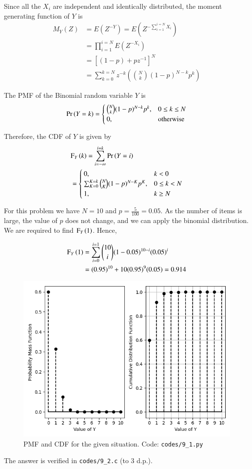 \documentclass[journal,12pt,twocolumn]{IEEEtran}
\begin{document}
\noindent Since all the $X_i$ are independent and identically distributed, the moment generating function of $Y$ is
\begin{align}
M_Y(Z) &= E(Z^{-Y}) = E(Z^{-\sum_{i = 1}^{i = N}X_i}) \\
&= \prod_{i = 1}^{i = N}E(Z^{-X_i}) \\
&= [(1 - p) + pz^{-1}]^N \\
&= \sum_{k = 0}^{k = N}z^{-k}(\binom{N}{k}(1 - p)^{N - k}p^k)
\label{mgf-Y}
\end{align}

\noindent The PMF of the Binomial random variable $Y$ is
\begin{align}
\Pr\left(Y = k\right) = 
\begin{cases}
\binom{N}{k}(1 - p)^{N - k}p^k, & 0 \leq k \leq N \\
0, & \textrm{otherwise}
\end{cases}
\label{pmf-Y}
\end{align}

\noindent Therefore, the CDF of $Y$ is given by
\begin{align}
&\text{F}_{Y}\left(k\right) = \sum_{i = -\infty}^{i = k}\Pr\left(Y = i\right) \nonumber\\
&=\begin{cases}
0, & k < 0 \\
\sum_{K = 0}^{K = k}\binom{N}{K}(1 - p)^{N - K}p^K, & 0 \leq k < N \\
1, & k \geq N
\end{cases}
\label{cdf-Y}
\end{align}

\noindent For this problem we have $N = 10$ and $p = \frac{5}{100} = 0.05$. As the number of items is large, the value of $p$ does not change, and we can apply the binomial distribution. We are required to find $\text{F}_{Y}\left(1\right)$. Hence, 

\begin{align}
\text{F}_{Y}\left(1\right) &= \sum_{i = 0}^{i = 1}\binom{10}{i}(1 - 0.05)^{10 - i}(0.05)^i \\
&= (0.95)^{10} + 10(0.95)^9(0.05) = 0.914
\end{align} 

\begin{figure}[!htb]
\includegraphics[width=\columnwidth]{figs/9_1.png}
\caption{PMF and CDF for the given situation. Code: \texttt{codes/9{\_}1.py}}
\label{fig:pmf-cdf}
\end{figure}
\noindent The answer is verified in \texttt{codes/9{\_}2.c} (to 3 d.p.).
\end{document}
